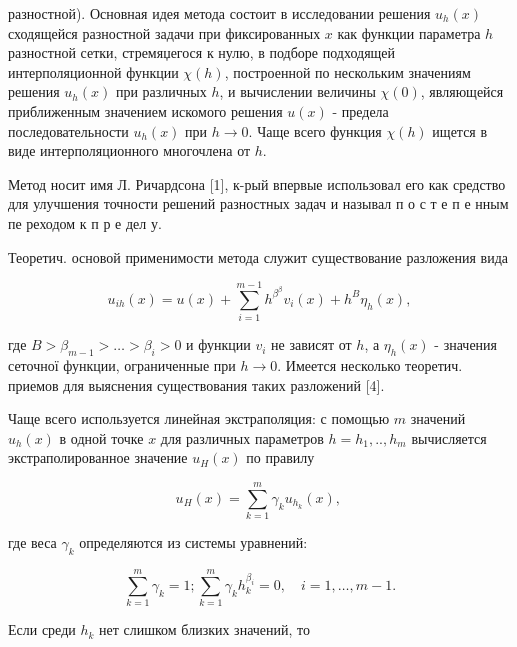 \documentclass[10pt]{article}
\begin{document}
разностной). Основная идея метода состоит в исследовании решения $u_{h}(x)$ сходящейся разностной задачи при фиксированных $x$ как функции параметра $h$ разностной сетки, стремяџегося к нулю, в подборе подходящей интерполяционной функции $\chi(h)$, построенной по нескольким значениям решения $u_{h}(x)$ при различных $h$, и вычислении величины $\chi(0)$, являющейся приближенным значением искомого решения $u(x)$ - предела последовательности $u_{h}(x)$ при $h \rightarrow 0$. Чаще всего функция $\chi(h)$ ищется в виде интерполяционного многочлена от $h$.



Метод носит имя Л. Ричардсона [1], к-рый впервые использовал его как средство для улучшения точности решений разностных задач и называл п о с т е п е нным пе реходом к п р е дел у.



Теоретич. основой применимости метода служит существование разложения вида



\[

u_{i h}(x)=u(x)+\sum_{i=1}^{m-1} h^{\beta^{\beta}} v_{i}(x)+h^{B} \eta_{h}(x),

\]



где $B>\beta_{m-1}>\ldots>\beta_{i}>0$ и функции $v_{i}$ не зависят от $h$, а $\eta_{h}(x)$ - значения сеточної функции, ограниченные при $h \rightarrow 0$. Имеется несколько теоретич. приемов для выяснения существования таких разложений [4].



Чаще всего используется линейная экстраполяция: с помощью $m$ значений $u_{h}(x)$ в одной точке $x$ для различных параметров $h=h_{1}, . ., h_{m}$ вычисляется экстраполированное значение $u_{H}(x)$ по правилу



\[

u_{H}(x)=\sum_{k=1}^{m} \gamma_{k} u_{h_{k}}(x) \text {, }

\]



где веса $\gamma_{k}$ определяются из системы уравнений:



\[

\sum_{k=1}^{m} \gamma_{k}=1 ; \sum_{k=1}^{m} \gamma_{k} h_{k}^{\beta_{i}}=0, \quad i=1, \ldots, m-1 .

\]



Если среди $h_{k}$ нет слишком близких значений, то
\end{document}
